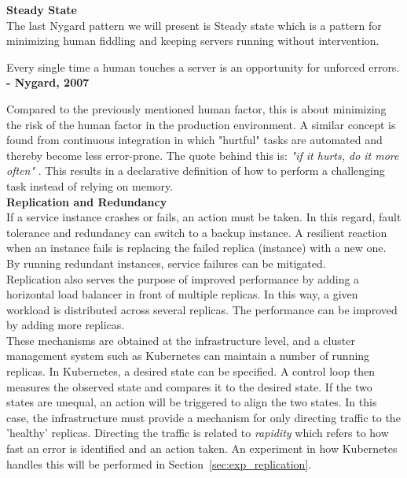\noindent \textbf{Steady State}
\\
The last Nygard pattern we will present is Steady state which is a pattern for minimizing human fiddling and keeping servers running without intervention. 
\begin{citat} []
Every single time a human touches a server is an opportunity for unforced errors. \textbf{- Nygard, 2007} \cite[p. 100]{nygard2007release}
\end{citat}

\noindent Compared to the previously mentioned human factor, this is about minimizing the risk of the human factor in the production environment. A similar concept is found from continuous integration in which "hurtful" tasks are automated and thereby become less error-prone. The quote behind this is: \textit{"if it hurts, do it more often"} \cite{fowler2011frequencyreducesdifficulty}. This results in a declarative definition of how to perform a challenging task instead of relying on memory. \\

\noindent \textbf{Replication and Redundancy} \\
If a service instance crashes or fails, an action must be taken. In this regard, fault tolerance and redundancy can switch to a backup instance. A resilient reaction when an instance fails is replacing the failed replica (instance) with a new one. By running redundant instances, service failures can be mitigated. \\

\noindent
Replication also serves the purpose of improved performance by adding a horizontal load balancer in front of multiple replicas. In this way, a given workload is distributed across several replicas. The performance can be improved by adding more replicas. \\

\noindent
These mechanisms are obtained at the infrastructure level, and a cluster management system such as Kubernetes can maintain a number of running replicas. In Kubernetes, a desired state can be specified. A control loop then measures the observed state and compares it to the desired state. If the two states are unequal, an action will be triggered to align the two states. In this case, the infrastructure must provide a mechanism for only directing traffic to the 'healthy' replicas. Directing the traffic is related to \textit{rapidity} which refers to how fast an error is identified and an action taken. An experiment in how Kubernetes handles this will be performed in Section~\ref{sec:exp_replication}.\\

